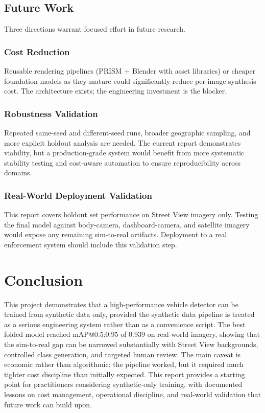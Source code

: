 \documentclass[12pt,a4paper]{article}
\begin{document}
\subsection{Future Work}

Three directions warrant focused effort in future research.

\subsubsection{Cost Reduction}

Reusable rendering pipelines (PRISM + Blender with asset libraries) or cheaper foundation models as they mature could significantly reduce per-image synthesis cost. The architecture exists; the engineering investment is the blocker.

\subsubsection{Robustness Validation}

Repeated same-seed and different-seed runs, broader geographic sampling, and more explicit holdout analysis are needed. The current report demonstrates viability, but a production-grade system would benefit from more systematic stability testing and cost-aware automation to ensure reproducibility across domains.

\subsubsection{Real-World Deployment Validation}

This report covers holdout set performance on Street View imagery only. Testing the final model against body-camera, dashboard-camera, and satellite imagery would expose any remaining sim-to-real artifacts. Deployment to a real enforcement system should include this validation step.

\section{Conclusion}

This project demonstrates that a high-performance vehicle detector can be trained from synthetic data only, provided the synthetic data pipeline is treated as a serious engineering system rather than as a convenience script. The best folded model reached mAP@0.5:0.95 of 0.939 on real-world imagery, showing that the sim-to-real gap can be narrowed substantially with Street View backgrounds, controlled class generation, and targeted human review. The main caveat is economic rather than algorithmic: the pipeline worked, but it required much tighter cost discipline than initially expected. This report provides a starting point for practitioners considering synthetic-only training, with documented lessons on cost management, operational discipline, and real-world validation that future work can build upon.
\end{document}

